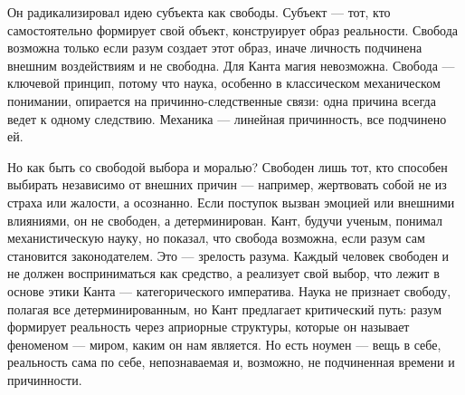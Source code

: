 
Он радикализировал идею субъекта как свободы. Субъект --- тот, кто самостоятельно формирует свой объект, конструирует образ реальности. Свобода возможна только если разум создает этот образ, иначе личность подчинена внешним воздействиям и не свободна.
Для Канта магия невозможна. Свобода --- ключевой принцип, потому что наука, особенно в классическом механическом понимании, опирается на причинно-следственные связи: одна причина всегда ведет к одному следствию. Механика --- линейная причинность, все подчинено ей.

Но как быть со свободой выбора и моралью? Свободен лишь тот, кто способен выбирать независимо от внешних причин --- например, жертвовать собой не из страха или жалости, а осознанно. Если поступок вызван эмоцией или внешними влияниями, он не свободен, а детерминирован.
Кант, будучи ученым, понимал механистическую науку, но показал, что свобода возможна, если разум сам становится законодателем. Это --- зрелость разума. Каждый человек свободен и не должен восприниматься как средство, а реализует свой выбор, что лежит в основе этики Канта --- категорического императива.
Наука не признает свободу, полагая все детерминированным, но Кант предлагает критический путь: разум формирует реальность через априорные структуры, которые он называет феноменом --- миром, каким он нам является. Но есть ноумен --- вещь в себе, реальность сама по себе, непознаваемая и, возможно, не подчиненная времени и причинности.

